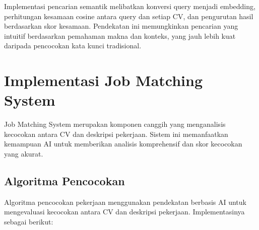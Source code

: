 Implementasi pencarian semantik melibatkan konversi query menjadi embedding, perhitungan kesamaan cosine antara query dan setiap CV, dan pengurutan hasil berdasarkan skor kesamaan. Pendekatan ini memungkinkan pencarian yang intuitif berdasarkan pemahaman makna dan konteks, yang jauh lebih kuat daripada pencocokan kata kunci tradisional.

\section{Implementasi Job Matching System}
Job Matching System merupakan komponen canggih yang menganalisis kecocokan antara CV dan deskripsi pekerjaan. Sistem ini memanfaatkan kemampuan AI untuk memberikan analisis komprehensif dan skor kecocokan yang akurat.

\subsection{Algoritma Pencocokan}
Algoritma pencocokan pekerjaan menggunakan pendekatan berbasis AI untuk mengevaluasi kecocokan antara CV dan deskripsi pekerjaan. Implementasinya sebagai berikut:

